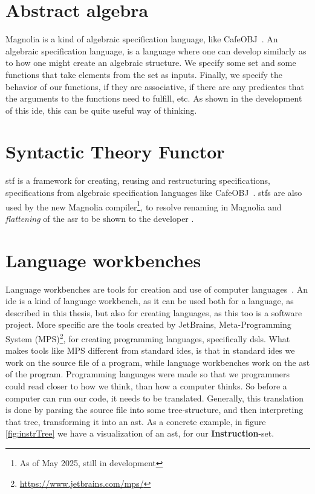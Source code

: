 \section{Abstract algebra} \label{sec:algebra}

Magnolia is a kind of algebraic specification language, like CafeOBJ~\cite{cafeObj}.
An algebraic specification language, is a language where one can develop
similarly as to how one might create an algebraic structure. We specify some set
and some functions that take elements from the set as inputs. Finally, we
specify the behavior of our functions, if they are associative, if there are any
predicates that the arguments to the functions need to fulfill, etc. As shown in
the development of this \gls*{ide}, this can be quite useful way of thinking.


\section{Syntactic Theory Functor} \label{sec:stf}

\gls*{stf} is a framework for creating, reusing and restructuring
specifications\cite{stf:haveraaen:2020}, specifications from algebraic
specification languages like CafeOBJ~\cite{cafeObj}. \gls*{stf}s are also used
by the new Magnolia compiler\footnote{As of May 2025, still in development}, to
resolve renaming in Magnolia and \textit{flattening} of the \gls*{asr} to be
shown to the developer \cite{wiig}.


\section{Language workbenches} \label{sec:lwb}

Language workbenches are tools for creation and use of computer languages~\cite{lwb}.
An \gls*{ide} is a kind of language workbench, as it can be used both for a
language, as described in this thesis, but also for creating languages, as this
too is a software project. More specific are the tools created by JetBrains,
Meta-Programming System (MPS)\footnote{\url{https://www.jetbrains.com/mps/}},
for creating programming languages, specifically \gls*{dsl}s. What makes tools
like MPS different from standard \gls*{ide}s, is that in standard \gls*{ide}s we
work on the source file of a program, while language workbenches work on the
\gls*{ast} of the program. Programming languages were made so that we
programmers could read closer to how we think, than how a computer thinks. So
before a computer can run our code, it needs to be translated. Generally, this
translation is done by parsing the source file into some tree-structure, and
then interpreting that tree, transforming it into an \gls*{ast}. As a concrete
example, in figure \ref{fig:instrTree} we have a visualization of an \gls*{ast},
for our \textbf{Instruction}-set.

